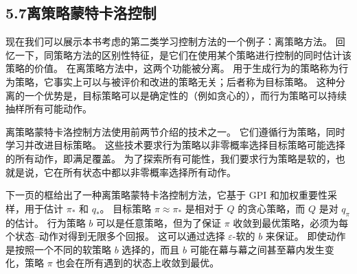 \documentclass[UTF8,12pt,a4paper,fontset=fandol]{ctexart}
\begin{document}
\subsection*{5.7\quad 离策略蒙特卡洛控制}

现在我们可以展示本书考虑的第二类学习控制方法的一个例子：离策略方法。
回忆一下，同策略方法的区别性特征，是它们在使用某个策略进行控制的同时估计该策略的价值。
在离策略方法中，这两个功能被分离。
用于生成行为的策略称为行为策略，它事实上可以与被评价和改进的策略无关；后者称为目标策略。
这种分离的一个优势是，目标策略可以是确定性的（例如贪心的），而行为策略可以持续抽样所有可能动作。

离策略蒙特卡洛控制方法使用前两节介绍的技术之一。
它们遵循行为策略，同时学习并改进目标策略。
这些技术要求行为策略以非零概率选择目标策略可能选择的所有动作，即满足覆盖。
为了探索所有可能性，我们要求行为策略是软的，也就是说，它在所有状态中都以非零概率选择所有动作。

下一页的框给出了一种离策略蒙特卡洛控制方法，它基于 GPI 和加权重要性采样，用于估计 $\pi_*$ 和 $q_*$。
目标策略 $\pi\approx\pi_*$ 是相对于 $Q$ 的贪心策略，而 $Q$ 是对 $q_\pi$ 的估计。
行为策略 $b$ 可以是任意策略，但为了保证 $\pi$ 收敛到最优策略，必须为每个状态--动作对得到无限多个回报。
这可以通过选择 $\varepsilon$-软的 $b$ 来保证。
即使动作是按照一个不同的软策略 $b$ 选择的，而且 $b$ 可能在幕与幕之间甚至幕内发生变化，策略 $\pi$ 也会在所有遇到的状态上收敛到最优。

\begin{center}
\end{center}
\end{document}

